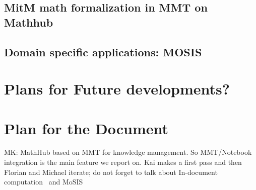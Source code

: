 \documentclass[book]{deliverablereport}
\begin{document}
\subsection{MitM math formalization in MMT on Mathhub}
\subsection{Domain specific applications: MOSIS}

\section{Plans for Future developments?}

\section{Plan for the Document}
MK: MathHub based on MMT for knowledge management. So MMT/Notebook integration is the main
feature we report on. Kai makes a first pass and then Florian and Michael iterate; do not
forget to talk about In-document computation~\cite{ODK-D4.9} and
MoSIS~\cite{PolKohKoe:kacse18} \printbibliography
\section{}
\end{document}
